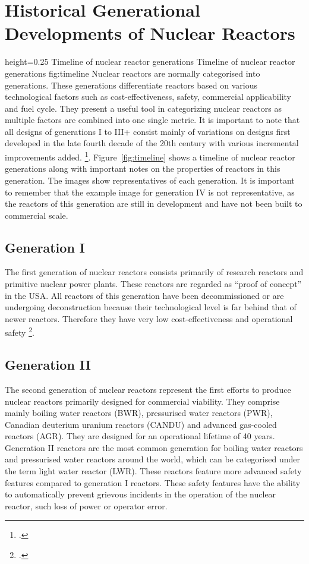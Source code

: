 \chapter{Historical Generational Developments of Nuclear Reactors}
    {height=0.25\textheight}
    {Timeline of nuclear reactor generations}
    {Timeline of nuclear reactor generations}
    {fig:timeline}
Nuclear reactors are normally categorised into generations. These generations differentiate
reactors based on various technological factors such as cost-effectiveness, safety, commercial applicability and
fuel cycle. They present a useful tool in categorizing nuclear reactors as multiple factors
are combined into one single metric. It is important to note that all designs of generations I
to III+ consist mainly of variations on designs first developed in the late fourth decade of the 20th century with
various incremental improvements added. \footcite[1,2]{Gen2gen}.
Figure~\ref{fig:timeline} shows a timeline of nuclear reactor generations along with important notes
on the properties of reactors in this generation. The images show representatives of each generation.
It is important to remember that the example image for generation IV is not representative, as the reactors
of this generation are still in development and have not been built to commercial scale.
\section{Generation I}
The first generation of nuclear reactors consists primarily of research reactors and primitive nuclear
power plants. These reactors are regarded as \enquote{proof of concept} in the USA. All reactors of
this generation have been decommissioned or are undergoing deconstruction because their technological level
is far behind that of newer reactors. Therefore they have very low cost-effectiveness and operational
safety \footcite[3]{Gen2gen}.
\section{Generation II}
The second generation of nuclear reactors represent the first efforts to produce nuclear reactors primarily
designed for commercial viability. They comprise mainly boiling water reactors (BWR), pressurised water reactors (PWR),
Canadian deuterium uranium reactors (CANDU) and advanced gas-cooled reactors (AGR).  They are designed
for an operational lifetime of 40 years. Generation II reactors are the most common generation for boiling
water reactors and pressurised water reactors around the world, which can be categorised under the term
light water reactor (LWR). These reactors feature more advanced safety features compared to generation I
reactors. These safety features have the ability to automatically prevent grievous incidents in the operation
of the nuclear reactor, such loss of power or operator error.

